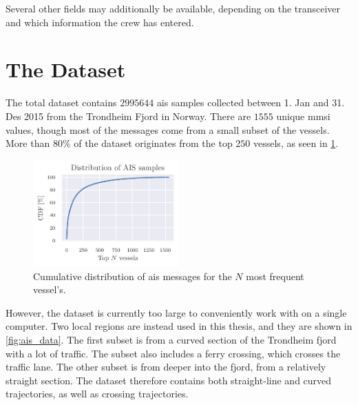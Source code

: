 Several other fields may additionally be available, depending on the transceiver and which information the crew has entered. 

\section{The Dataset}
The total dataset contains $2995644$ \acrshort{ais} samples collected between 1. Jan and 31. Des 2015 from the Trondheim Fjord in Norway. There are $1555$ unique \acrshort{mmsi} values, though most of the messages come from a small subset of the vessels. More than $80\%$ of the dataset originates from the top $250$ vessels, as seen in \cref{fig:ais_cdf}.

\begin{figure}[h]
    \centering
    \includegraphics[width=0.5\textwidth]{figures/mmsi_cdf.pdf}
    \caption{Cumulative distribution of \acrshort{ais} messages for the $N$ most frequent vessel's.}
    \label{fig:ais_cdf}
\end{figure}

However, the dataset is currently too large to conveniently work with on a single computer. Two local regions are instead used in this thesis, and they are shown in \cref{fig:ais_data}. The first subset is from a curved section of the Trondheim fjord with a lot of traffic. The subset also includes a ferry crossing, which crosses the traffic lane. The other subset is from deeper into the fjord, from a relatively straight section. The dataset therefore contains both straight-line and curved trajectories, as well as crossing trajectories. 

